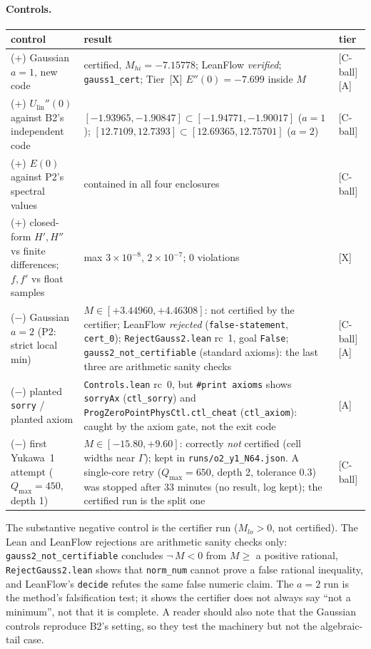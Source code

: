 \documentclass[10pt]{article}
\newcommand{\tier}[1]{\textsf{[#1]}}
\newcommand{\tA}{\tier{A}}
\newcommand{\tX}{\tier{X}}
\newcommand{\tCb}{\textcolor{blue!60!black}{\textsf{[C-ball]}}}
\newcommand{\lean}[1]{\texttt{#1}}
\newcommand{\Ulin}{U_{\mathrm{lin}}}
\begin{document}
\paragraph{Controls.}
\begin{center}\small\begin{tabular}{p{4.3cm}p{8.5cm}p{1.6cm}}\toprule
control & result & tier\\\midrule
(+) Gaussian $a=1$, new code & certified, $M_{hi}=-7.15778$; LeanFlow \emph{verified}; \lean{gauss1\_cert}; Tier~\tX{} $E''(0)=-7.699$ inside $M$ & \tCb\,\tA\\
(+) $\Ulin''(0)$ against B2's independent code & $[-1.93965,-1.90847]\subset[-1.94771,-1.90017]$ ($a=1$); $[12.7109,12.7393]\subset[12.69365,12.75701]$ ($a=2$) & \tCb\\
(+) $E(0)$ against P2's spectral values & contained in all four enclosures & \tCb\\
(+) closed-form $H',H''$ vs finite differences; $f,f'$ vs float samples & max $3\times10^{-8}$, $2\times10^{-7}$; 0 violations & \tX\\
($-$) Gaussian $a=2$ (P2: strict local min) & $M\in[+3.44960,+4.46308]$: not certified by the certifier; LeanFlow \emph{rejected} (\texttt{false-statement}, \texttt{cert\_0}); \texttt{RejectGauss2.lean} rc~1, goal \lean{False}; \lean{gauss2\_not\_certifiable} (standard axioms): the last three are arithmetic sanity checks & \tCb\,\tA\\
($-$) planted \lean{sorry} / planted axiom & \texttt{Controls.lean} rc~0, but \lean{\#print axioms} shows \lean{sorryAx} (\lean{ctl\_sorry}) and \lean{ProgZeroPointPhysCtl.ctl\_cheat} (\lean{ctl\_axiom}): caught by the axiom gate, not the exit code & \tA\\
($-$) first Yukawa~1 attempt ($Q_{\max}=450$, depth 1) & $M\in[-15.80,+9.60]$: correctly \emph{not} certified (cell widths near $\Gamma$); kept in \texttt{runs/o2\_y1\_N64.json}. A single-core retry ($Q_{\max}=650$, depth 2, tolerance 0.3) was stopped after 33 minutes (no result, log kept); the certified run is the split one & \tCb\\
\bottomrule\end{tabular}\end{center}
The substantive negative control is the certifier run ($M_{lo}>0$, not certified). The Lean and LeanFlow rejections are arithmetic sanity checks only: \lean{gauss2\_not\_certifiable} concludes $\neg\,M<0$ from $M\ge$ a positive rational, \texttt{RejectGauss2.lean} shows that \lean{norm\_num} cannot prove a false rational inequality, and LeanFlow's \lean{decide} refutes the same false numeric claim. The $a=2$ run is the method's falsification test; it shows the certifier does not always say ``not a minimum'', not that it is complete. A reader should also note that the Gaussian controls reproduce B2's setting, so they test the machinery but not the algebraic-tail case.
\end{document}
